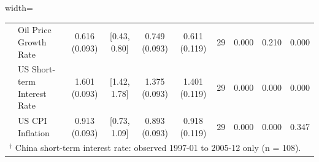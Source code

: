 \begin{table}[!htbp]
\begin{adjustbox}{width=\textwidth}
\begin{tabular}{llcccccccc}
 & Oil Price Growth Rate & 0.616 (0.093) & [0.43, 0.80] & 0.749 (0.093) & 0.611 (0.119) & 29 & 0.000 & 0.210 & 0.000 \\
 & US Short-term Interest Rate & 1.601 (0.093) & [1.42, 1.78] & 1.375 (0.093) & 1.401 (0.119) & 29 & 0.000 & 0.000 & 0.000 \\
 & US CPI Inflation & 0.913 (0.093) & [0.73, 1.09] & 0.893 (0.093) & 0.918 (0.119) & 29 & 0.000 & 0.000 & 0.347 \\
\hline
\multicolumn{10}{l}{$^{\dagger}$ China short-term interest rate: observed 1997-01 to 2005-12 only (n = 108).} \\
\end{tabular}
\end{adjustbox}
\label{Table_Whittle_Estimator}
\end{table}
